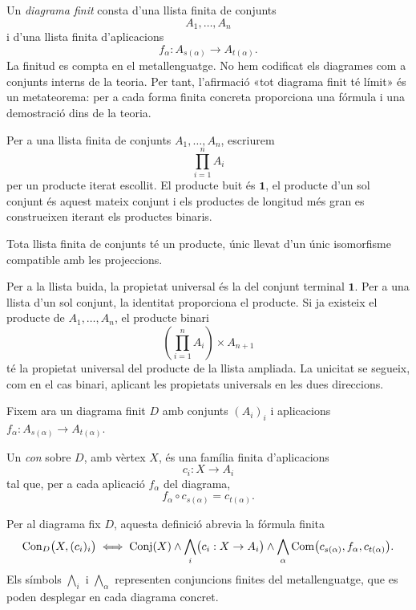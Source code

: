 \begin{observacio}\label{obs:diagrama-metateoric}
Un \emph{diagrama finit} consta d'una llista finita de conjunts
\[
A_1,\ldots,A_n
\]
i d'una llista finita d'aplicacions
\[
f_\alpha:A_{s(\alpha)}\to A_{t(\alpha)}.
\]
La finitud es compta en el metallenguatge. No hem codificat els diagrames com a conjunts interns de la teoria. Per tant, l'afirmació «tot diagrama finit té límit» és un metateorema: per a cada forma finita concreta proporciona una fórmula i una demostració dins de la teoria.
\end{observacio}

\begin{notacio}\label{not:productes-finits}
Per a una llista finita de conjunts \(A_1,\ldots,A_n\), escriurem
\[
\prod_{i=1}^{n}A_i
\]
per un producte iterat escollit. El producte buit és \(\mathbf1\), el producte d'un sol conjunt és aquest mateix conjunt i els productes de longitud més gran es construeixen iterant els productes binaris.
\end{notacio}

\begin{proposicio}\label{prop:productes-finits}
Tota llista finita de conjunts té un producte, únic llevat d'un únic isomorfisme compatible amb les projeccions.
\end{proposicio}

\begin{prova}
Per a la llista buida, la propietat universal és la del conjunt terminal \(\mathbf1\). Per a una llista d'un sol conjunt, la identitat proporciona el producte. Si ja existeix el producte de \(A_1,\ldots,A_n\), el producte binari
\[
\left(\prod_{i=1}^{n}A_i\right)\times A_{n+1}
\]
té la propietat universal del producte de la llista ampliada. La unicitat se segueix, com en el cas binari, aplicant les propietats universals en les dues direccions.
\end{prova}

Fixem ara un diagrama finit \(D\) amb conjunts \((A_i)_i\) i aplicacions \(f_\alpha:A_{s(\alpha)}\to A_{t(\alpha)}\).

\begin{definicio}[Con]\label{def:con}
Un \emph{con} sobre \(D\), amb vèrtex \(X\), és una família finita d'aplicacions
\[
c_i:X\to A_i
\]
tal que, per a cada aplicació \(f_\alpha\) del diagrama,
\[
f_\alpha\circ c_{s(\alpha)}=c_{t(\alpha)}.
\]

Per al diagrama fix \(D\), aquesta definició abrevia la fórmula finita
\[
\operatorname{Con}_D\bigl(X,(c_i)_i\bigr)
\iff
\operatorname{Conj}(X)
\land
\bigwedge_i\bigl(c_i:X\to A_i\bigr)
\land
\bigwedge_\alpha
\operatorname{Com}\bigl(c_{s(\alpha)},f_\alpha,c_{t(\alpha)}\bigr).
\]
Els símbols \(\bigwedge_i\) i \(\bigwedge_\alpha\) representen conjuncions finites del metallenguatge, que es poden desplegar en cada diagrama concret.
\end{definicio}

